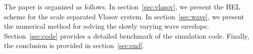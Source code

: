 The paper is  organized  as follows. 
 In section~\ref{sec:vlasov}, we present 
 the HEL scheme for the scale separated Vlasov system.
 In section~\ref{sec:wave}, we present  the numerical method for solving the slowly varying  wave envelope. Section~\ref{sec:code} provides a detailed benchmark of the simulation code. Finally, the conclusion is provided in section~\ref{sec:end}.


